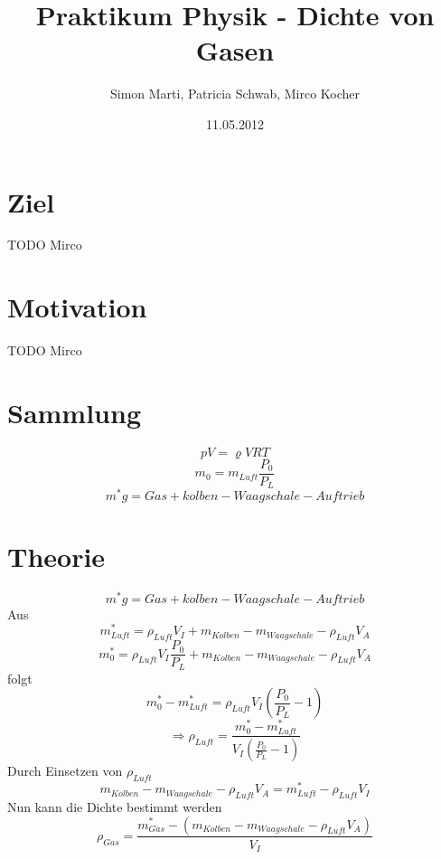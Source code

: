 \documentclass[12pt,a4paper]{article}
\title{Praktikum Physik - Dichte von Gasen}
\author{Simon Marti, Patricia Schwab, Mirco Kocher}
\date{11.05.2012}
\begin{document}
\maketitle

\section*{Ziel}
TODO Mirco


\section*{Motivation}
TODO Mirco


\section*{Sammlung}
\[ p V = \varrho V R T \]
\[ m_0 = m_{Luft} \frac{P_0}{P_L} \]
\[ m^* g = Gas + kolben - Waagschale - Auftrieb \]

\section*{Theorie}
\[ m^* g = Gas + kolben - Waagschale - Auftrieb \]
Aus
\[ m^*_{Luft} = \rho _{Luft} V_I + m_{Kolben} - m_{Waagschale} - \rho_{Luft} V_A \]
\[ m^*_0 = \rho_{Luft} V_I \frac{P_0}{P_L} + m_{Kolben} - m_{Waagschale} - \rho_{Luft} V_A  \]
folgt
\[ m^*_0 - m^*_{Luft} = \rho_{Luft}V_I \left( \frac{P_0}{P_L}-1\right) \]
\[ \Rightarrow \rho_{Luft} = \frac{m^*_0 - m^*_{Luft}}{V_I \left( \frac{P_0}{P_L}-1\right)} \]
Durch Einsetzen von $\rho_{Luft}$
\[ m_{Kolben} - m_{Waagschale} - \rho_{Luft} V_A = m^*_{Luft} - \rho _{Luft} V_I \]
Nun kann die Dichte bestimmt werden
\[ \rho _{Gas} = \frac{m^*_{Gas} - (m_{Kolben} - m_{Waagschale} - \rho_{Luft} V_A)}{V_I} \]
\end{document}
